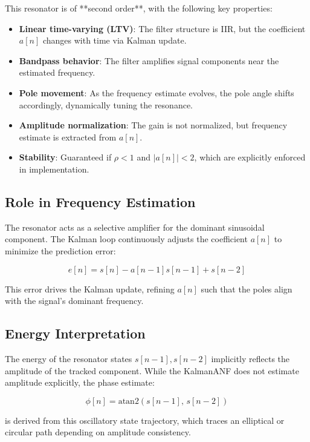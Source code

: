 \documentclass{article}
\begin{document}
This resonator is of **second order**, with the following key properties:

\begin{itemize}
    \item \textbf{Linear time-varying (LTV)}: The filter structure is IIR, but the coefficient $a[n]$ changes with time via Kalman update.
    \item \textbf{Bandpass behavior}: The filter amplifies signal components near the estimated frequency.
    \item \textbf{Pole movement}: As the frequency estimate evolves, the pole angle shifts accordingly, dynamically tuning the resonance.
    \item \textbf{Amplitude normalization}: The gain is not normalized, but frequency estimate is extracted from $a[n]$.
    \item \textbf{Stability}: Guaranteed if $\rho < 1$ and $|a[n]| < 2$, which are explicitly enforced in implementation.
\end{itemize}

\subsection{Role in Frequency Estimation}

The resonator acts as a selective amplifier for the dominant sinusoidal component. The Kalman loop continuously adjusts the coefficient $a[n]$ to minimize the prediction error:

\begin{equation}
e[n] = s[n] - a[n-1] s[n-1] + s[n-2]
\end{equation}

This error drives the Kalman update, refining $a[n]$ such that the poles align with the signal's dominant frequency.

\subsection{Energy Interpretation}

The energy of the resonator states $s[n-1], s[n-2]$ implicitly reflects the amplitude of the tracked component. While the KalmanANF does not estimate amplitude explicitly, the phase estimate:

\begin{equation}
\phi[n] = \mathrm{atan2}(s[n-1],\, s[n-2])
\end{equation}

is derived from this oscillatory state trajectory, which traces an elliptical or circular path depending on amplitude consistency.
\end{document}
